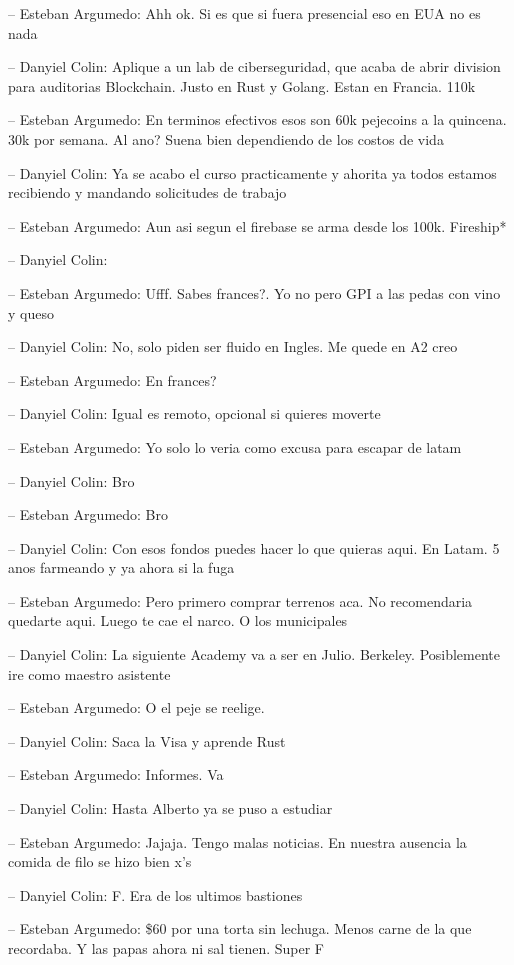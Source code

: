 -- Esteban Argumedo: Ahh ok. Si es que si fuera presencial eso en EUA no
es nada

-- Danyiel Colin: Aplique a un lab de ciberseguridad, que acaba de abrir
division para auditorias Blockchain. Justo en Rust y Golang. Estan en
Francia. 110k

-- Esteban Argumedo: En terminos efectivos esos son 60k pejecoins a la
quincena. 30k por semana. Al ano? Suena bien dependiendo de los costos
de vida

-- Danyiel Colin: Ya se acabo el curso practicamente y ahorita ya todos
estamos recibiendo y mandando solicitudes de trabajo

-- Esteban Argumedo: Aun asi segun el firebase se arma desde los 100k.
Fireship*

-- Danyiel Colin:

-- Esteban Argumedo: Ufff. Sabes frances?. Yo no pero GPI a las pedas
con vino y queso

-- Danyiel Colin: No, solo piden ser fluido en Ingles. Me quede en A2
creo

-- Esteban Argumedo: En frances?

-- Danyiel Colin: Igual es remoto, opcional si quieres moverte

-- Esteban Argumedo: Yo solo lo veria como excusa para escapar de latam

-- Danyiel Colin: Bro

-- Esteban Argumedo: Bro

-- Danyiel Colin: Con esos fondos puedes hacer lo que quieras aqui. En
Latam. 5 anos farmeando y ya ahora si la fuga

-- Esteban Argumedo: Pero primero comprar terrenos aca. No recomendaria
quedarte aqui. Luego te cae el narco. O los municipales

-- Danyiel Colin: La siguiente Academy va a ser en Julio. Berkeley.
Posiblemente ire como maestro asistente

-- Esteban Argumedo: O el peje se reelige.

-- Danyiel Colin: Saca la Visa y aprende Rust

-- Esteban Argumedo: Informes. Va

-- Danyiel Colin: Hasta Alberto ya se puso a estudiar

-- Esteban Argumedo: Jajaja. Tengo malas noticias. En nuestra ausencia
la comida de filo se hizo bien x's

-- Danyiel Colin: F. Era de los ultimos bastiones

-- Esteban Argumedo: \$60 por una torta sin lechuga. Menos carne de la
que recordaba. Y las papas ahora ni sal tienen. Super F

